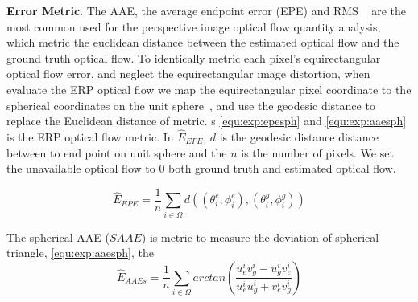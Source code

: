 \textbf{Error Metric}.
%
The AAE, the average endpoint error (EPE) and RMS  ~\cite{BakerSLRBS2011} are the most common used for the perspective image optical flow quantity analysis, which metric the euclidean distance between the estimated optical flow and the ground truth optical flow.
To identically metric each pixel's equirectangular optical flow error, and neglect the equirectangular image distortion, when evaluate the ERP optical flow we map the equirectangular pixel coordinate to the spherical coordinates on the unit sphere~\cite{??}, and use the geodesic distance to replace the Euclidean distance of metric. 
s%
%
\cref{equ:exp:epesph} and \cref{equ:exp:aaesph} is the ERP optical flow metric.
In $\hat{E}_{EPE}$, $d$ is the geodesic distance distance between to end point on unit sphere and the $n$ is the number of pixels.
We set the unavailable optical flow to 0 both ground truth and estimated optical flow.

\begin{equation}\label{equ:exp:epesph}
	\hat{E}_{EPE} = \frac{1}{n} \sum_{i \in \Omega} d\left( (\theta^e_i,\phi^e_i), (\theta^g_i,\phi^g_i)\right) 
\end{equation}

The spherical AAE ($SAAE$) is metric to measure the deviation of spherical triangle, \cref{equ:exp:aaesph}, the 
\begin{equation}\label{equ:exp:aaesph}
	\hat{E}_{AAEs} = \frac{1}{n} \sum_{i \in \Omega}arctan(\frac{u^i_e v^i_g - u^i_g v^i_e}{u^i_e u^i_g + v^i_e v^i_g})
\end{equation}

